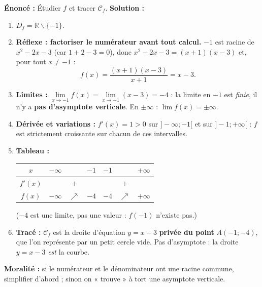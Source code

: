 \documentclass[11pt]{article}
\def\setminus{\mathbin{\backslash}}\let\smallsetminus\setminus
\begin{document}
\begin{exoresolu}[Étude complète : Fonction rationnelle $f(x) = \frac{x^2 - 2x - 3}{x+1}$ (un piège classique)]
\textbf{Énoncé :} Étudier $f$ et tracer $\mathcal{C}_f$.
\tcblower
\textbf{Solution :}
\begin{enumerate}
  \item $D_f = \mathbb{R} \setminus \{-1\}$.
  \item \textbf{Réflexe : factoriser le numérateur avant tout calcul.} $-1$ est racine de $x^2-2x-3$ (car $1+2-3=0$), donc $x^2-2x-3=(x+1)(x-3)$ et, pour tout $x \neq -1$ :
  \[ f(x) = \frac{(x+1)(x-3)}{x+1} = x - 3. \]
  \item \textbf{Limites :} $\lim\limits_{x \to -1} f(x) = \lim\limits_{x \to -1} (x-3) = -4$ : la limite en $-1$ est \emph{finie}, il n'y a \textbf{pas d'asymptote verticale}. En $\pm\infty$ : $\lim f(x) = \pm\infty$.
  \item \textbf{Dérivée et variations :} $f'(x) = 1 > 0$ sur $]-\infty;-1[$ et sur $]-1;+\infty[$ : $f$ est strictement croissante sur chacun de ces intervalles.
  \item \textbf{Tableau :}
  \begin{center}
  \begin{tabular}{|c|ccc||ccc|}
  \hline
  $x$ & $-\infty$ & & $-1$ & $-1$ & & $+\infty$ \\
  \hline
  $f'(x)$ & & $+$ & & & $+$ & \\
  \hline
  $f(x)$ & $-\infty$ & $\nearrow$ & $-4$ & $-4$ & $\nearrow$ & $+\infty$ \\
  \hline
  \end{tabular}
  \end{center}
  ($-4$ est une limite, pas une valeur : $f(-1)$ n'existe pas.)
  \item \textbf{Tracé :} $\mathcal{C}_f$ est la droite d'équation $y = x-3$ \textbf{privée du point} $A(-1;-4)$, que l'on représente par un petit cercle vide. Pas d'asymptote : la droite $y=x-3$ \emph{est} la courbe.
\end{enumerate}
\textbf{Moralité :} si le numérateur et le dénominateur ont une racine commune, simplifier d'abord ; sinon on « trouve » à tort une asymptote verticale.
\end{exoresolu}
\end{document}

